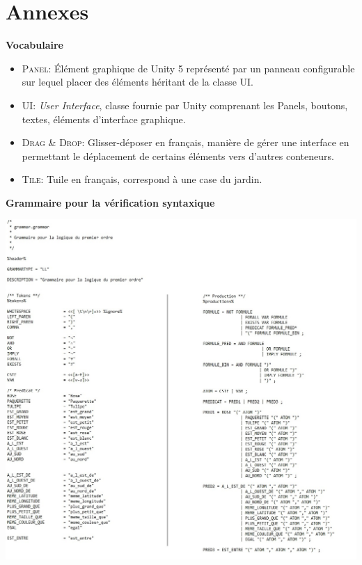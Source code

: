\part*{Annexes}

\begin{center}\textbf{Vocabulaire}\end{center}

\begin{itemize}
\item \textsc{Panel}: Élément graphique de Unity 5 représenté par un panneau configurable sur lequel placer des éléments héritant de la classe UI.
\item \textsc{UI}: \textit{User Interface}, classe fournie par Unity comprenant les Panels, boutons, textes, éléments d'interface graphique. 
\item \textsc{Drag \& Drop}: Glisser-déposer en français, manière de gérer une interface en permettant le déplacement de certains éléments vers d'autres conteneurs. 
\item \textsc{Tile}: Tuile en français, correspond à une case du jardin.
\end{itemize}

\begin{center}\textbf{Grammaire pour la vérification syntaxique}\end{center}

\begin{center}
\includegraphics[scale=0.5]{annexes/grammaire.jpg}
\end{center}